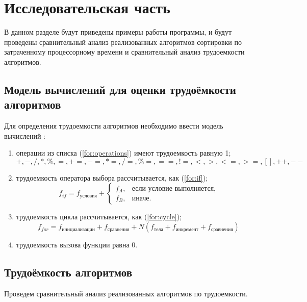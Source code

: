 \chapter{Исследовательская часть}

В данном разделе будут приведены примеры работы программы, и будут проведены сравнительный анализ реализованных алгоритмов сортировки по затраченному процессорному времени и сравнительный анализ трудоемкости алгоритмов.

\section{Модель вычислений для оценки трудоёмкости алгоритмов}

Для определения трудоемкости алгоритмов необходимо ввести модель вычислений \cite{model}:

\begin{enumerate}
	\item операции из списка (\ref{for:operations}) имеют трудоемкость равную 1;
	\begin{equation}
		\label{for:operations}
		+, -, /, *, \%, =, +=, -=, *=, /=, \%=, ==, !=, <, >, <=, >=, [], ++, {-}-
	\end{equation}
	\item трудоемкость оператора выбора  рассчитывается, как (\ref{for:if});
	\begin{equation}
		\label{for:if}
		f_{if} = f_{\text{условия}} +
		\begin{cases}
			f_A, & \text{если условие выполняется,}\\
			f_B, & \text{иначе.}
		\end{cases}
	\end{equation}
	\item трудоемкость цикла рассчитывается, как (\ref{for:cycle});
	\begin{equation}
		\label{for:cycle}
		f_{for} = f_{\text{инициализации}} + f_{\text{сравнения}} + N(f_{\text{тела}} + f_{\text{инкремент}} + f_{\text{сравнения}})
	\end{equation}
	\item трудоемкость вызова функции равна 0.
\end{enumerate}

\section{Трудоёмкость алгоритмов}

Проведем сравнительный анализ реализованных алгоритмов по трудоемкости.

